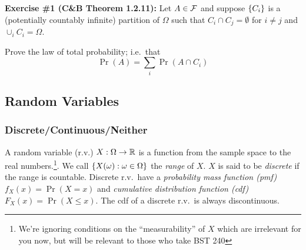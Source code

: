 \begin{tcolorbox}
    \textbf{Exercise \#1 (C\&B Theorem 1.2.11):}
    Let $A \in \mathcal F$ and suppose $\{C_i\}$ is a (potentially countably infinite) partition of $\Omega$ such that 
    $C_i \cap C_j = \emptyset$ for $i \neq j$ and $\cup_i C_i = \Omega$.

    Prove the law of total probability; i.e.\ that 
    \[
        \Pr(A)
        =
        \sum_{i} \Pr(A \cap C_i)
    \]
\end{tcolorbox}

\subsection{Random Variables}

\subsubsection{Discrete/Continuous/Neither}

A random variable (r.v.) $X: \Omega \rightarrow \mathbb R$ is a function from the 
sample space to the real numbers.\footnote{We're ignoring conditions on 
the ``measurability'' of $X$ which are irrelevant for you now, but will be 
relevant to those who take BST 240}. We call $\{X(\omega): \omega \in \Omega\}$
the \emph{range} of $X$. $X$ is said to be \emph{discrete} if the range is countable.
Discrete r.v.\ have a \emph{probability mass function (pmf)} $f_X(x) = \Pr(X = x)$
and \emph{cumulative distribution function (cdf)} $F_X(x) = \Pr(X \leq x)$.
The cdf of a discrete r.v.\ is always discontinuous.

